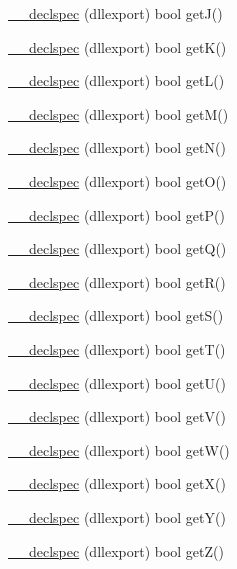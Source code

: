 \begin{DoxyCompactItemize}
\item 
\hyperlink{class_keyboard_ab2b1fc2f251bb39b2390df94fda19433}{\-\_\-\-\_\-declspec} (dllexport) bool get\-J()
\item 
\hyperlink{class_keyboard_a48a031bf1e16b91195e6a9edfea6c55c}{\-\_\-\-\_\-declspec} (dllexport) bool get\-K()
\item 
\hyperlink{class_keyboard_a2d07a5175521f3c35fc1fc710c96712b}{\-\_\-\-\_\-declspec} (dllexport) bool get\-L()
\item 
\hyperlink{class_keyboard_ad09d4c2e64162beb3ff6c8c619167258}{\-\_\-\-\_\-declspec} (dllexport) bool get\-M()
\item 
\hyperlink{class_keyboard_ad7782194563db196111cbff3130f5286}{\-\_\-\-\_\-declspec} (dllexport) bool get\-N()
\item 
\hyperlink{class_keyboard_acb80111cd179f94c6671c21344e4ff32}{\-\_\-\-\_\-declspec} (dllexport) bool get\-O()
\item 
\hyperlink{class_keyboard_a834166a01fd43f25f99d0d33f2e9d555}{\-\_\-\-\_\-declspec} (dllexport) bool get\-P()
\item 
\hyperlink{class_keyboard_a3ff65c18846beccf2abf93e609cc0a42}{\-\_\-\-\_\-declspec} (dllexport) bool get\-Q()
\item 
\hyperlink{class_keyboard_aef7de60e40ba5aa7815ea6286ee4709a}{\-\_\-\-\_\-declspec} (dllexport) bool get\-R()
\item 
\hyperlink{class_keyboard_a35d6a4967695fdb084a90993498ecc1b}{\-\_\-\-\_\-declspec} (dllexport) bool get\-S()
\item 
\hyperlink{class_keyboard_a6576fa5f0e8ebbfef1904994ecca8bad}{\-\_\-\-\_\-declspec} (dllexport) bool get\-T()
\item 
\hyperlink{class_keyboard_a6fb672aa5c57766ce308af41514e1f0f}{\-\_\-\-\_\-declspec} (dllexport) bool get\-U()
\item 
\hyperlink{class_keyboard_af24f2ff146fbfb714e202a385eff5ee3}{\-\_\-\-\_\-declspec} (dllexport) bool get\-V()
\item 
\hyperlink{class_keyboard_a7e2a649cfdc428ef67f4353193391e15}{\-\_\-\-\_\-declspec} (dllexport) bool get\-W()
\item 
\hyperlink{class_keyboard_aeab38e6d38f4579e4fb33e6e338ed802}{\-\_\-\-\_\-declspec} (dllexport) bool get\-X()
\item 
\hyperlink{class_keyboard_a5f7c993be209da588bf99de0ba72e345}{\-\_\-\-\_\-declspec} (dllexport) bool get\-Y()
\item 
\hyperlink{class_keyboard_a276ccbac38035e794ddf5b508edc7b3f}{\-\_\-\-\_\-declspec} (dllexport) bool get\-Z()

\end{DoxyCompactItemize}
